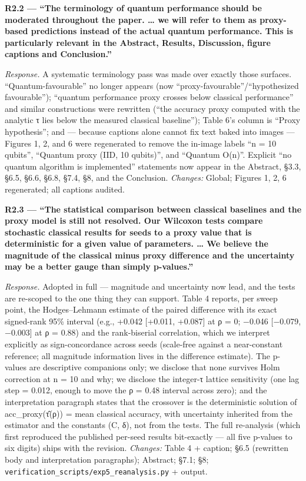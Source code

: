 \documentclass[
  11pt,
]{article}
\begin{document}
\textbf{R2.2 --- ``The terminology of quantum performance should be
moderated throughout the paper. \ldots{} we will refer to them as
proxy-based predictions instead of the actual quantum performance. This
is particularly relevant in the Abstract, Results, Discussion, figure
captions and Conclusion.''}

\emph{Response.} A systematic terminology pass was made over exactly
those surfaces. ``Quantum-favourable'' no longer appears (now
``proxy-favourable''/``hypothesized favourable''); ``quantum performance
proxy crosses below classical performance'' and similar constructions
were rewritten (``the accuracy proxy computed with the analytic τ lies
below the measured classical baseline''); Table 6's column is ``Proxy
hypothesis''; and --- because captions alone cannot fix text baked into
images --- Figures 1, 2, and 6 were regenerated to remove the in-image
labels ``n = 10 qubits'', ``Quantum proxy (IID, 10 qubits)'', and
``Quantum O(n)''. Explicit ``no quantum algorithm is implemented''
statements now appear in the Abstract, §3.3, §6.5, §6.6, §6.8, §7.4, §8,
and the Conclusion. \emph{Changes:} Global; Figures 1, 2, 6 regenerated;
all captions audited.

\textbf{R2.3 --- ``The statistical comparison between classical
baselines and the proxy model is still not resolved. Our Wilcoxon tests
compare stochastic classical results for seeds to a proxy value that is
deterministic for a given value of parameters. \ldots{} We believe the
magnitude of the classical minus proxy difference and the uncertainty
may be a better gauge than simply p-values.''}

\emph{Response.} Adopted in full --- magnitude and uncertainty now lead,
and the tests are re-scoped to the one thing they can support. Table 4
reports, per sweep point, the Hodges--Lehmann estimate of the paired
difference with its exact signed-rank 95\% interval (e.g., +0.042
{[}+0.011, +0.087{]} at ρ = 0; −0.046 {[}−0.079, −0.003{]} at ρ = 0.88)
and the rank-biserial correlation, which we interpret explicitly as
sign-concordance across seeds (scale-free against a near-constant
reference; all magnitude information lives in the difference estimate).
The p-values are descriptive companions only; we disclose that none
survives Holm correction at n = 10 and why; we disclose the integer-τ
lattice sensitivity (one lag step = 0.012, enough to move the ρ = 0.48
interval across zero); and the interpretation paragraph states that the
crossover is the deterministic solution of acc\_proxy(τ̂(ρ)) = mean
classical accuracy, with uncertainty inherited from the estimator and
the constants (C, δ), not from the tests. The full re-analysis (which
first reproduced the published per-seed results bit-exactly --- all five
p-values to six digits) ships with the revision. \emph{Changes:} Table 4
+ caption; §6.5 (rewritten body and interpretation paragraphs);
Abstract; §7.1; §8; \texttt{verification\_scripts/exp5\_reanalysis.py} +
output.
\end{document}
